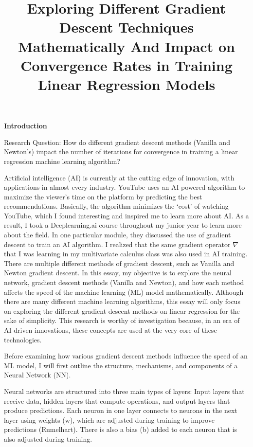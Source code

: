 \documentclass[12pt]{article}
\title{Exploring Different Gradient Descent Techniques Mathematically And Impact on Convergence Rates in Training Linear Regression Models}	%
\theoremstyle{definition}
\begin{document}
\begin{flushleft}
\textbf{Introduction}
\end{flushleft}
Research Question: How do different gradient descent methods (Vanilla and Newton's) impact the number of iterations for convergence in training a linear regression machine learning algorithm?

Artificial intelligence (AI) is currently at the cutting edge of innovation, with applications in almost every industry. YouTube uses an AI-powered algorithm to maximize the viewer's time on the platform by predicting the best recommendations. Basically, the algorithm minimizes the `cost' of watching YouTube, which I found interesting and inspired me to learn more about AI. As a result, I took a Deeplearning.ai course throughout my junior year to learn more about the field. In one particular module, they discussed the use of gradient descent to train an AI algorithm. I realized that the same gradient operator $\nabla$ that I was learning in my multivariate calculus class was also used in AI training. There are multiple different methods of gradient descent, such as Vanilla and Newton gradient descent. In this essay, my objective is to explore the neural network, gradient descent methods (Vanilla and Newton), and how each method affects the speed of the machine learning (ML) model mathematically. Although there are many different machine learning algorithms, this essay will only focus on exploring the different gradient descent methods on linear regression for the sake of simplicity. This research is worthy of investigation because, in an era of AI-driven innovations, these concepts are used at the very core of these technologies.

Before examining how various gradient descent methods influence the speed of an ML model, I will first outline the structure, mechanisms, and components of a Neural Network (NN).

Neural networks are structured into three main types of layers: Input layers that receive data, hidden layers that compute operations, and output layers that produce predictions. Each neuron in one layer connects to neurons in the next layer using weights (w), which are adjusted during training to improve predictions (Rumelhart). There is also a bias (b) added to each neuron that is also adjusted during training.
\end{document}
